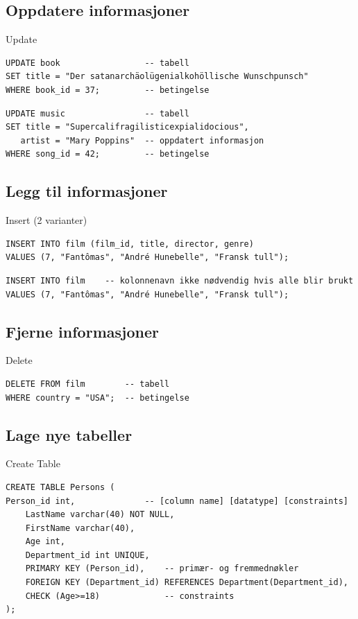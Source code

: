 \subsection*{Oppdatere informasjoner}
\begin{frame}[fragile]{Update}
\begin{verbatim}
UPDATE book                 -- tabell
SET title = "Der satanarchäolügenialkohöllische Wunschpunsch"
WHERE book_id = 37;         -- betingelse
\end{verbatim}
\pause
\vspace{-5mm}
\begin{verbatim}
UPDATE music                -- tabell
SET title = "Supercalifragilisticexpialidocious",
   artist = "Mary Poppins"  -- oppdatert informasjon
WHERE song_id = 42;         -- betingelse
\end{verbatim}
\end{frame}

\subsection*{Legg til informasjoner}
\begin{frame}[fragile]{Insert (2 varianter)}
\begin{verbatim}
INSERT INTO film (film_id, title, director, genre)
VALUES (7, "Fantômas", "André Hunebelle", "Fransk tull"); 
\end{verbatim}
\pause
\begin{verbatim}
INSERT INTO film    -- kolonnenavn ikke nødvendig hvis alle blir brukt
VALUES (7, "Fantômas", "André Hunebelle", "Fransk tull"); 
\end{verbatim}
\end{frame}

\subsection*{Fjerne informasjoner}
\begin{frame}[fragile]{Delete}
\begin{verbatim}
DELETE FROM film        -- tabell
WHERE country = "USA";  -- betingelse
\end{verbatim}
\end{frame}

\subsection*{Lage nye tabeller}
\begin{frame}[fragile]{Create Table}
\begin{verbatim}
CREATE TABLE Persons (
Person_id int,              -- [column name] [datatype] [constraints]
    LastName varchar(40) NOT NULL,
    FirstName varchar(40),
    Age int,
    Department_id int UNIQUE,
    PRIMARY KEY (Person_id),    -- primær- og fremmednøkler
    FOREIGN KEY (Department_id) REFERENCES Department(Department_id),
    CHECK (Age>=18)             -- constraints
);
\end{verbatim}
\end{frame}

